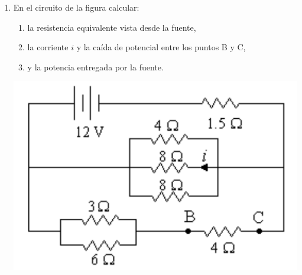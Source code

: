 \documentclass[11pt,spanish,a4paper]{article}
\begin{document}
\begin{enumerate}
	\item \begin{minipage}[t][3.5cm]{0.6\textwidth}
		En el circuito de la figura calcular:
		\begin{enumerate}
			\item la resistencia equivalente vista desde la fuente,
			\item la corriente \(i\) y la caída de potencial entre los puntos B y C,
  			\item y la potencia entregada por la fuente.
		\end{enumerate}
    \end{minipage}
    \begin{minipage}[c][1em][t]{0.3\textwidth}
            \includegraphics[width=\textwidth]{p3e04}
    \end{minipage}



\end{enumerate}
\end{document}
